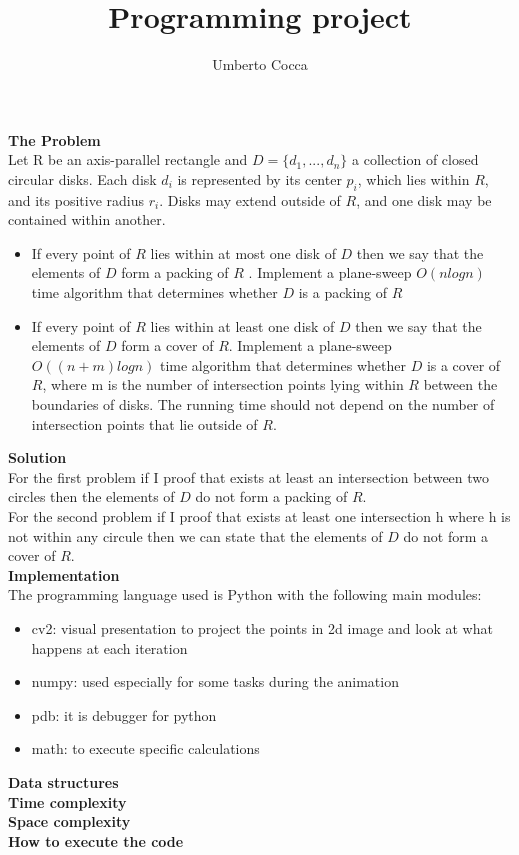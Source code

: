 \documentclass[12pt]{article}
\title{Programming project}
\author{Umberto Cocca}
\date{}
\begin{document}
\maketitle
\noindent \textbf{The Problem}\\
Let R be an axis-parallel rectangle and $D = \{d_1, ..., d_n\}$ a collection of closed circular disks.
Each disk $d_i$ is represented by its center $p_i$, which lies within $R$, and its positive radius $r_i$. Disks may extend outside of $R$, and one disk may be contained within another.

\begin{itemize}
	\item If every point of $R$ lies within at most one disk of $D$ then we say that the
	elements of $D$ form a packing of $R$ . Implement a plane-sweep $O(n log n)$ time algorithm
	that determines whether $D$ is a packing of $R$
	\item If every point of $R$ lies within at least one disk of $D$ then we say that the elements of $D$ form a cover of $R$. Implement a plane-sweep $O((n+m) log n)$ time algorithm that determines whether $D$ is a cover of $R$, where m is the number of intersection points lying within $R$ between the boundaries of disks. The running time should not depend on
	the number of intersection points that lie outside of $R$.
\end{itemize}


\noindent \textbf{Solution}\\
For the first problem if I proof that exists at least an intersection between two circles then the elements of $D$ do not form a packing of $R$. \\

\noindent For the second problem if I proof that exists at least one intersection h where h is not within any circule then we can state that the elements of $D$ do not form a cover of $R$. \\

\noindent \textbf{Implementation}\\
The programming language used is Python with the following main modules:
\begin{itemize}
	\item cv2: visual presentation to project the points in 2d image and look at what happens at each iteration
	\item numpy: used especially for some tasks during the animation
	\item pdb: it is debugger for python
	\item math: to execute specific calculations
\end{itemize}

\noindent \textbf{Data structures}\\

\noindent \textbf{Time complexity}\\

\noindent \textbf{Space complexity}\\

\noindent \textbf{How to execute the code}\\
\end{document}
